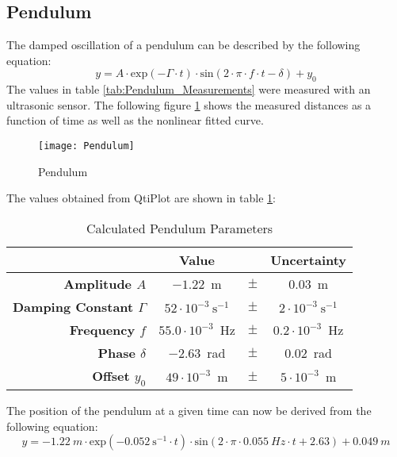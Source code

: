 \subsection{Pendulum}
\label{subsec:Pendulum}
The damped oscillation of a pendulum can be described by the following equation:
\begin{equation}
y=A\cdot \text{exp}(-\Gamma\cdot t)\cdot\text{sin}(2\cdot\pi\cdot f\cdot t-\delta)+y_0
\end{equation}
The values in table \ref{tab:Pendulum_Measurements} were measured with an ultrasonic sensor. The following figure \ref{fig:Pendulum} shows the measured distances as a function of time as well as the nonlinear fitted curve.
\begin{figure}[H]
	\centering
	\texttt{[image: Pendulum]}
	\caption{Pendulum}
	\label{fig:Pendulum}
\end{figure}
The values obtained from QtiPlot are shown in table \ref{tab:Calculated_Pendulum_Parameters}:
\begin{table}[H]
	\centering
	\renewcommand{\arraystretch}{1.3}
	\begin{tabular}{r|c c c}
		& \textbf{Value} & & \textbf{Uncertainty} \\
		\hline\hline
		\textbf{Amplitude $A$} & $-1.22$\ m & $\pm$ & $0.03$\ m \\
		\textbf{Damping Constant $\Gamma$} & $52\cdot10^{-3}\ \text{s}^{-1}$ & $\pm$ & $2\cdot10^{-3}\ \text{s}^{-1}$ \\
		\textbf{Frequency $f$} & $55.0\cdot10^{-3}$\ Hz & $\pm$ & $0.2\cdot10^{-3}$\ Hz \\
		\textbf{Phase $\delta$} & $-2.63$\ rad & $\pm$ & $0.02$\ rad \\
		\textbf{Offset $y_0$} & $49\cdot10^{-3}$\ m & $\pm$  & $5\cdot10^{-3}$\ m \\
	\end{tabular}
	\caption{Calculated Pendulum Parameters}
	\label{tab:Calculated_Pendulum_Parameters}
\end{table}
The position of the pendulum at a given time can now be derived from the following equation:
\begin{equation}
y=-1.22\ m\cdot \text{exp}(-0.052\ \text{s}^{-1}\cdot t)\cdot\text{sin}(2\cdot\pi\cdot0.055\ Hz\cdot t+2.63)+0.049\ m
\end{equation}
\newpage
